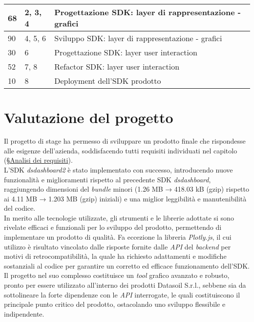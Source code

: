 \begin{center}
\begin{longtable}{|p{2.5cm}|p{2.5cm}|p{7.5cm}|}
        68                                 & 2, 3, 4                                          & Progettazione SDK: layer di rappresentazione - grafici                          \\
        \hline
        90                                 & 4, 5, 6                                          & Sviluppo SDK: layer di  rappresentazione - grafici                              \\
        \hline
        30                                 & 6                                                & Progettazione SDK: layer user interaction                                       \\
        \hline
        52                                 & 7, 8                                             & Refactor SDK: layer user interaction                                            \\
        \hline
        10                                 & 8                                                & Deployment dell'SDK prodotto                                                    \\
    \end{longtable}
    \label{tab:consuntivo_finale}
\end{center}


\section{Valutazione del progetto}
Il progetto di stage ha permesso di sviluppare un prodotto finale che rispondesse alle esigenze dell'azienda, soddisfacendo tutti requisiti individuati nel capitolo
(\S \href{chapter:analisi_requisiti}{Analisi dei requisiti}). \\
L'SDK \textit{dsdashboard2} è stato implementato con successo, introducendo nuove funzionalità e miglioramenti rispetto al precedente SDK \textit{dsdashboard},
raggiungendo dimensioni del \textit{bundle} minori (1.26 MB → 418.03 kB (gzip) rispetto ai 4.11 MB → 1.203 MB (gzip) iniziali) e una miglior leggibilità
e manutenibilità del codice. \\
In merito alle tecnologie utilizzate, gli strumenti e le librerie adottate si sono rivelate efficaci e funzionali per lo sviluppo del prodotto, permettendo di
implementare un prodotto di qualità. Fa eccezione la libreria \textit{Plotly.js}, il cui utilizzo è risultato vincolato dalle risposte fornite dalle \textit{API} del \textit{backend} per
motivi di retrocompatibilità, la quale ha richiesto adattamenti e modifiche sostanziali al codice per garantire un corretto ed efficace funzionamento dell'SDK. \\
Il progetto nel suo complesso costituisce un \textit{tool} grafico avanzato e robusto, pronto per essere utilizzato all'interno dei prodotti Datasoil S.r.l., sebbene sia
da sottolineare la forte dipendenze con le \textit{API} interrogate, le quali costituiscono il principale punto critico del prodotto, ostacolando uno sviluppo flessibile e indipendente.

